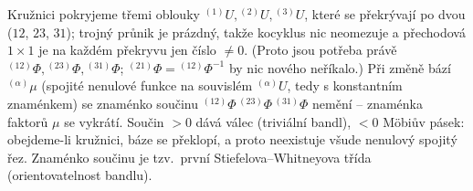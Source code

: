 \begin{vysvetleni}
Kružnici pokryjeme třemi oblouky ${}^{(1)}U,{}^{(2)}U,{}^{(3)}U$, které se překrývají po dvou ($12$, $23$, $31$); trojný průnik je prázdný, takže
kocyklus nic neomezuje a přechodová  $1\times1$ je na každém překryvu jen číslo $\neq0$.
(Proto jsou potřeba právě ${}^{(12)}\Phi,{}^{(23)}\Phi,{}^{(31)}\Phi$; ${}^{(21)}\Phi={}^{(12)}\Phi^{-1}$ by nic nového neříkalo.)
Při změně bází ${}^{(\alpha)}\mu$ (spojité nenulové funkce na souvislém ${}^{(\alpha)}U$, tedy s konstantním znaménkem) se znaménko součinu
${}^{(12)}\Phi\,{}^{(23)}\Phi\,{}^{(31)}\Phi$ nemění -- znaménka faktorů $\mu$ se vykrátí. Součin $>0$ dává válec (triviální bandl), $<0$ Möbiův pásek: obejdeme-li kružnici, báze se překlopí,
a proto neexistuje všude nenulový spojitý řez. Znaménko součinu je tzv.\ první Stiefelova--Whitneyova třída (orientovatelnost bandlu).
\end{vysvetleni}

\newpage
{}

